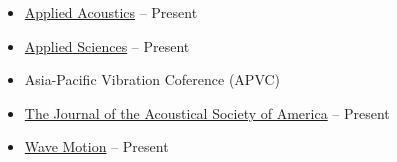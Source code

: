 \documentclass[10pt,a4paper,ragged2e,withhyper]{altacv}
\newcommand{\hrefhl}[2]{{\color{accent}\href{#1}{#2}}}
\begin{document}
\begin{itemize}
    \item \hrefhl{https://www.journals.elsevier.com/applied-acoustics}{Applied Acoustics} \hfill {} -- Present

    \item \hrefhl{https://www.mdpi.com/journal/applsci}{Applied Sciences} \hfill {} -- Present

    \item Asia-Pacific Vibration Coference (APVC) \hfill {} 

    \item \hrefhl{https://asa.scitation.org/journal/jas}{The Journal of the Acoustical Society of America} \hfill {} -- Present

    \item \hrefhl{https://www.sciencedirect.com/journal/wave-motion}{Wave Motion} \hfill {} -- Present

\end{itemize}


\end{document}
